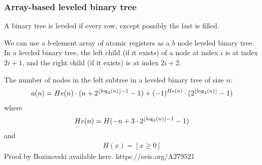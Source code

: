 \documentclass{beamer}
\DeclarePairedDelimiter\floor{\lfloor}{\rfloor}
\begin{document}
\begin{frame}[fragile]
\frametitle{Array-based leveled binary tree}
\begin{definition}
	A binary tree is leveled if every row, except possibly the last is filled.
\end{definition}
We can use a $b$-element array of atomic registers as a $b$ node leveled binary tree. 
In a leveled binary tree, the left child (if it exists) of a node at index $i$ is at index $2i + 1$, and the right child (if it exists) is at index $2i + 2$.
\begin{figure}
	\begin{subfigure}[b]{0.47\textwidth}
	\centering
	\hspace{10cm}
	\end{subfigure}
\hfill
	\begin{subfigure}[b]{0.47\textwidth}
	\end{subfigure}
\end{figure}
\end{frame}
\begin{frame}
The number of nodes in the left subtree in a leveled binary tree of size $n$:
\begin{align*}
	a(n) = He(n) \cdot (n + 2^{\floor{\log_2(n)}-1} - 1) + (-1)^{He(n)}\cdot(2^{\floor{\log_2(n)}} - 1)
\end{align*}
where 
\begin{align*}
	He(n) = H(-n + 3\cdot2^{\floor{\log_2(n)}-1} - 1) 
\end{align*}
and 
\begin{align*}
	H(x) = [x \ge 0]
\end{align*}
Proof by Bozinovski available here.
https://oeis.org/A279521
\end{frame}
\end{document}
